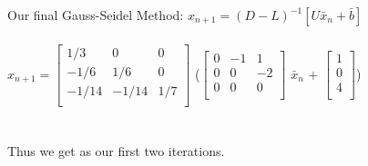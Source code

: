 \documentclass[12pt]{article}
\begin{document}
\begin{enumerate}
Our final Gauss-Seidel Method: $x_{n+1} = (D-L)^{-1}[U\bar{x}_n + \bar{b}]$\\ \\
$x_{n+1} = \begin{bmatrix}
   1/3 & 0 & 0 \\
   -1/6 & 1/6 & 0 \\
   -1/14 & -1/14 & 1/7 \\
\end{bmatrix}$ ($\begin{bmatrix}
   0 & -1 & 1 \\
   0 & 0 & -2 \\
   0 & 0 & 0 \\
\end{bmatrix}$ $\bar{x}_n$ + $\begin{bmatrix}
   1 \\
   0   \\
   4   \\
\end{bmatrix}$) \\ \\ \\
Thus we get  as our first two iterations.


\end{enumerate}
\end{document}
